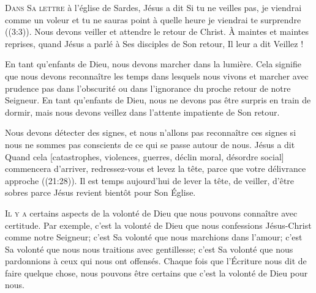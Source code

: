 


\lettrine{D}{ans Sa lettre} à l'église de Sardes,
 Jésus a dit\frcolon{} 
 \Og Si tu ne veilles pas, je viendrai comme un voleur et tu ne sauras point
 à quelle heure je viendrai te surprendre \Fg{} ((3:3)).
 Nous devons veiller et attendre le retour de Christ.
 À maintes et maintes reprises, quand Jésus a parlé à Ses disciples
 de Son retour, Il leur a dit\frcolon{}  \Og Veillez ! \Fg{}


En tant qu'enfants de Dieu, nous devons marcher dans la lumière.
 Cela signifie que nous devons reconnaître les temps dans lesquels nous vivons
 et marcher avec prudence \ocadr pas dans l'obscurité ou dans l'ignorance
 du proche retour de notre Seigneur. En tant qu'enfants de Dieu,
 nous ne devons pas être surpris en train de dormir,
 mais nous devons veillez dans l'attente impatiente de Son retour.

Nous devons détecter des signes, et nous n'allons pas reconnaître ces signes
 si nous ne sommes pas conscients de ce qui se passe autour de nous.
 Jésus a dit\frcolon{} 
 \Og Quand cela [catastrophes, violences, guerres, déclin moral,
 désordre social] commencera d'arriver, redressez-vous et levez la tête,
 parce que votre délivrance approche \Fg{} ((21:28)).
 Il est temps aujourd'hui de lever la tête, de veiller, d'être sobres
 \ocadr parce Jésus revient bientôt pour Son Église. 

\dvrule






\lettrine{I}{l y a} certains aspects de la volonté de Dieu
 que nous pouvons connaître avec certitude. Par exemple, c'est la volonté
 de Dieu que nous confessions Jésus-Christ comme notre Seigneur;
 c'est Sa volonté que nous marchions dans l'amour;
 c'est Sa volonté que nous nous traitions avec gentillesse;
 c'est Sa volonté que nous pardonnions à ceux qui nous ont offensés.
 Chaque fois que l'Écriture nous dit de faire quelque chose,
 nous pouvons être certains que c'est la volonté de Dieu pour nous.

